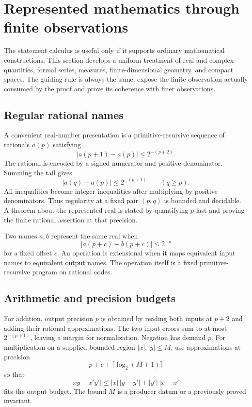 \section{Represented mathematics through finite observations}

The statement calculus is useful only if it supports ordinary mathematical constructions.  This section develops a uniform treatment of real and complex quantities, formal series, measures, finite-dimensional geometry, and compact spaces.  The guiding rule is always the same: expose the finite observation actually consumed by the proof and prove its coherence with finer observations.

\subsection{Regular rational names}

A convenient real-number presentation is a primitive-recursive sequence of rationals $a(p)$ satisfying
\[
 |a(p+1)-a(p)|\leq 2^{-(p+2)}.
\]
The rational is encoded by a signed numerator and positive denominator.  Summing the tail gives
\[
 |a(q)-a(p)|\leq 2^{-(p+1)}\qquad(q\geq p).
\]
All inequalities become integer inequalities after multiplying by positive denominators.  Thus regularity at a fixed pair $(p,q)$ is bounded and decidable.  A theorem about the represented real is stated by quantifying $p$ last and proving the finite rational assertion at that precision.

Two names $a,b$ represent the same real when
\[
 |a(p+c)-b(p+c)|\leq 2^{-p}
\]
for a fixed offset $c$.  An operation is extensional when it maps equivalent input names to equivalent output names.  The operation itself is a fixed primitive-recursive program on rational codes.

\subsection{Arithmetic and precision budgets}

For addition, output precision $p$ is obtained by reading both inputs at $p+2$ and adding their rational approximations.  The two input errors sum to at most $2^{-(p+1)}$, leaving a margin for normalization.  Negation has demand $p$.  For multiplication on a supplied bounded region $|x|,|y|\leq M$, use approximations at precision
\[
 p+c+\lceil\log_2(M+1)\rceil
\]
so that
\[
 |xy-x'y'|
 \leq |x|\,|y-y'|+|y'|\,|x-x'|
\]
fits the output budget.  The bound $M$ is a producer datum or a previously proved invariant.

